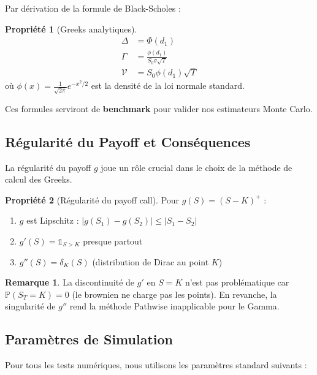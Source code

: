 \documentclass[a4paper,11pt]{article}
\theoremstyle{definition}
\newtheorem{propriete}{Propriété}[section]
\newtheorem{remarque}{Remarque}[section]
\begin{document}
Par dérivation de la formule de Black-Scholes :

\begin{propriete}[Greeks analytiques]
\begin{align}
\Delta &= \Phi(d_1) \\
\Gamma &= \frac{\phi(d_1)}{S_0 \sigma \sqrt{T}} \\
\mathcal{V} &= S_0 \phi(d_1) \sqrt{T}
\end{align}
où $\phi(x) = \frac{1}{\sqrt{2\pi}} e^{-x^2/2}$ est la densité de la loi normale standard.
\end{propriete}

Ces formules serviront de \textbf{benchmark} pour valider nos estimateurs Monte Carlo.

\subsection{Régularité du Payoff et Conséquences}

La régularité du payoff $g$ joue un rôle crucial dans le choix de la méthode de calcul des Greeks.

\begin{propriete}[Régularité du payoff call]
Pour $g(S) = (S-K)^+$ :
\begin{enumerate}
    \item $g$ est Lipschitz : $|g(S_1) - g(S_2)| \leq |S_1 - S_2|$
    \item $g'(S) = \mathbb{1}_{S > K}$ presque partout
    \item $g''(S) = \delta_K(S)$ (distribution de Dirac au point $K$)
\end{enumerate}
\end{propriete}

\begin{remarque}
La discontinuité de $g'$ en $S=K$ n'est pas problématique car $\mathbb{P}(S_T = K) = 0$ (le brownien ne charge pas les points). En revanche, la singularité de $g''$ rend la méthode Pathwise inapplicable pour le Gamma.
\end{remarque}

\subsection{Paramètres de Simulation}

Pour tous les tests numériques, nous utilisons les paramètres standard suivants :
\end{document}

